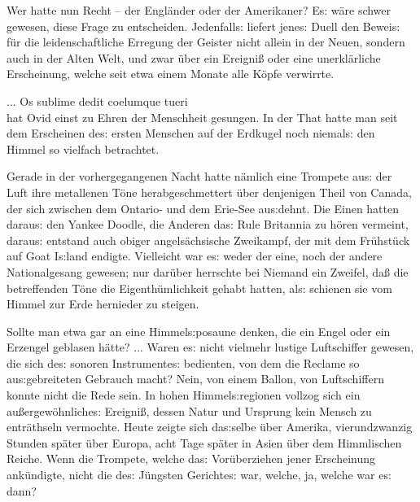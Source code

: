 \documentclass[oneside,12pt]{book}
\newenvironment{antiqua}{\normalfont}{}
\newcommand{\s}{s:}
\begin{document}
Wer hatte nun Recht -- der Engl\"ander oder der Amerikaner? E{\s}
w\"are schwer gewesen, diese Frage zu entscheiden. Jedenfall{\s}
liefert jene{\s} Duell den Bewei{\s} f\"ur die leidenschaftliche
Erregung der Geister nicht allein in der Neuen, sondern auch in der
Alten Welt, und zwar \"uber ein Ereigni{\ss} oder eine
unerkl\"arliche Erscheinung, welche seit etwa einem Monate alle
K\"opfe verwirrte.

\begin{antiqua}... Os sublime dedit coelumque tueri\end{antiqua}\\
hat Ovid einst zu Ehren der Menschheit gesungen. In der That hatte
man seit dem Erscheinen de{\s} ersten Menschen auf der Erdkugel noch
niemal{\s} den Himmel so vielfach betrachtet.

Gerade in der vorhergegangenen Nacht hatte n\"amlich eine Trompete
au{\s} der Luft ihre metallenen T\"one herabgeschmettert \"uber
denjenigen Theil von Canada, der sich zwischen dem Ontario- und dem
Erie-See au{\s}dehnt. Die Einen hatten darau{\s} den
\begin{antiqua}Yankee Doodle\end{antiqua}, die Anderen da{\s}
\begin{antiqua}Rule Britannia\end{antiqua} zu h\"oren vermeint,
darau{\s} entstand auch obiger angels\"achsische Zweikampf, der mit
dem Fr\"uhst\"uck auf Goat I{\s}land endigte. Vielleicht war e{\s}
weder der eine, noch der andere Nationalgesang gewesen; nur dar\"uber
herrschte bei Niemand ein Zweifel, da{\ss} die betreffenden T\"one
die Eigenth\"umlichkeit gehabt hatten, al{\s} schienen sie vom Himmel
zur Erde hernieder zu steigen.

Sollte man etwa gar an eine Himmel{\s}posaune denken, die ein Engel
oder ein Erzengel geblasen h\"atte? ... Waren e{\s} nicht vielmehr
lustige Luftschiffer gewesen, die sich de{\s} sonoren Instrumente{\s}
bedienten, von dem die Reclame so au{\s}gebreiteten Gebrauch macht?
Nein, von einem Ballon, von Luftschiffern konnte nicht die Rede sein.
In hohen Himmel{\s}regionen vollzog sich ein au{\ss}ergew\"ohnliche{\s}
Ereigni{\ss}, dessen Natur und Ursprung kein Mensch zu entr\"athseln
vermochte. Heute zeigte sich da{\s}selbe \"uber Amerika,
vierundzwanzig Stunden sp\"ater \"uber Europa, acht Tage sp\"ater in
Asien \"uber dem Himmlischen Reiche. Wenn die Trompete, welche da{\s}
Vor\"uberziehen jener Erscheinung ank\"undigte, nicht die de{\s}
J\"ungsten Gerichte{\s} war, welche, ja, welche war e{\s} dann?
\end{document}
